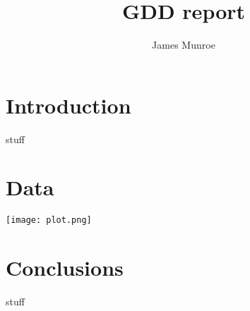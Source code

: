 \documentclass{article}
\title{GDD report}
\author{James Munroe}
\begin{document}
\maketitle

\section{Introduction}

stuff

\section{Data}

\texttt{[image: plot.png]}

\section{Conclusions}

stuff
\end{document}
